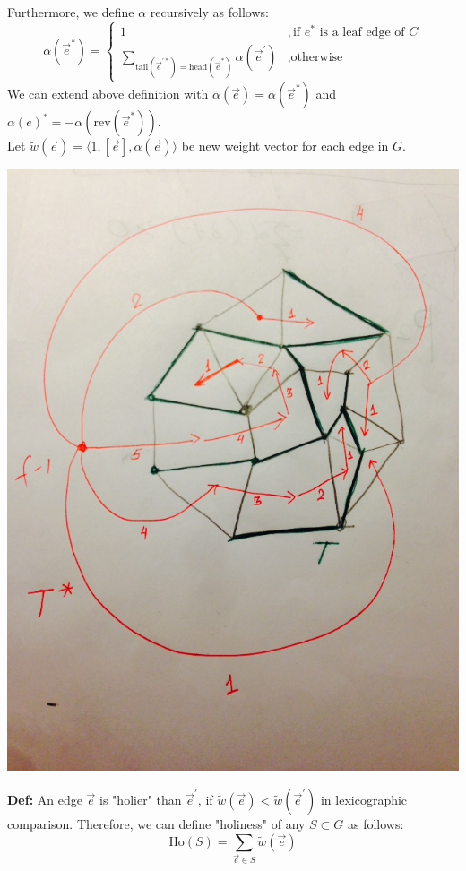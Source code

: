 \documentclass{article}
\begin{document}
Furthermore, we define $\alpha$ recursively as follows: \\
\[ \alpha(\vec{e}^*) = \begin{cases} 1 & ,\mbox{if } e^* \mbox{ is a leaf edge of } C \\
                           \sum \limits_{ \text{tail}(\vec{e}^{'*})
                           = \text{head}(\vec{e}^*) } \alpha(\vec{e}^{'}) & ,\mbox{otherwise} \end{cases}\]
We can extend above definition with $\alpha(\vec{e}) = \alpha( \vec{e}^* )$ and $\alpha(e)^* = - \alpha(\text{rev}(\vec{e}^*))$. \\
Let $\tilde w(\vec{e}) = \langle 1, [\vec{e}], \alpha(\vec{e}) \rangle$ be new weight vector for each edge in $G$.
\begin{center}
\includegraphics[scale = 0.3]{alphaDef.jpg}
\end{center}

\textbf{\underline{Def:}} An edge $\vec{e}$ is "holier" than $\vec{e}^{'}$, if $\tilde w(\vec{e}) < \tilde w(\vec{e}^{'})$ in lexicographic comparison. Therefore, we can define "holiness" of any $S \subset G $ as follows:
\[\text{Ho}(S) = \sum \limits_{\vec{e} \in S} \tilde w(\vec{e})\]
\end{document}
